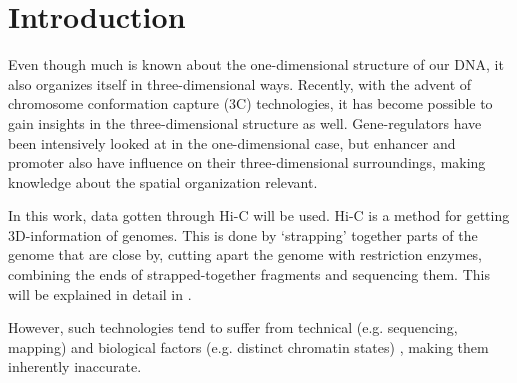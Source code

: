 \chapter{Introduction}\label{chap:introduction}

%
%
%
%
%
%


Even though much is known about the one-dimensional structure of our DNA, it
also organizes itself in three-dimensional ways. Recently, with the advent of
chromosome conformation capture (3C) technologies, it has become possible to gain
insights in the three-dimensional structure as well. Gene-regulators have been
intensively looked at in the one-dimensional case, but enhancer and promoter
also have influence on their three-dimensional surroundings, making knowledge
about the spatial organization relevant.

In this work, data gotten through Hi-C \cite{lieberman2009comprehensive} will
be used. Hi-C is a method for getting 3D-information of genomes.  This is done
by `strapping' together parts of the genome that are close by, cutting apart
the genome with restriction enzymes, combining the ends of strapped-together
fragments and sequencing them. This will be explained in detail in
.


However, such technologies tend to suffer from technical (e.g. sequencing,
mapping) \cite{pmid21646344} and biological factors (e.g. distinct chromatin
states) \cite{pmid19693276}, making them inherently inaccurate.

